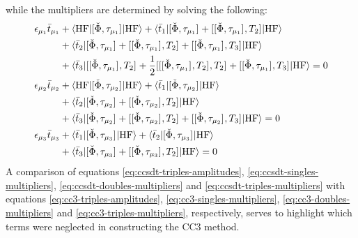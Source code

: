 while the multipliers are determined by solving the following:
\begin{subequations}\label{eq:ccsdt-multipliers}
  \begin{align}
    \epsilon_{\mu_1}\bar{t}_{\mu_1} &+
    \braket{\mathrm{HF} | [ \check{\Phi}, \tau_{\mu_1} ]^{} | \mathrm{HF}} +
    \braket{\bar{t}_{1} |
      [ \check{\Phi}, \tau_{\mu_1} ]^{}
    + [ [ \check{\Phi}, \tau_{\mu_1} ]^{}, T_2 ]^{}
    | \mathrm{HF}} \nonumber \\
   &+ \braket{\bar{t}_{2} |
      [ \check{\Phi}, \tau_{\mu_1} ]^{}
    + [ [ \check{\Phi}, \tau_{\mu_1} ]^{}, T_2 ]^{}
    + [ [ \check{\Phi}, \tau_{\mu_1} ]^{}, T_3 ]^{}
    | \mathrm{HF}} \nonumber \\
   &+ \braket{\bar{t}_{3} |
      [ [ \check{\Phi}, \tau_{\mu_1} ]^{}, T_2 ]^{}
    + \frac{1}{2}[ [ [ \check{\Phi}, \tau_{\mu_1} ]^{}, T_2 ]^{}, T_2 ]^{}
    + [ [ \check{\Phi}, \tau_{\mu_1} ]^{}, T_3 ]^{}
    | \mathrm{HF}}
             = 0 \label{eq:ccsdt-singles-multipliers} \\
    \epsilon_{\mu_2}\bar{t}_{\mu_2} &+
    \braket{\mathrm{HF} | [ \check{\Phi}, \tau_{\mu_2} ]^{} | \mathrm{HF}} +
    \braket{\bar{t}_{1} |
      [ \check{\Phi}, \tau_{\mu_2} ]^{}
    | \mathrm{HF}} \nonumber \\
   &+ \braket{\bar{t}_{2} |
      [ \check{\Phi}, \tau_{\mu_2} ]^{}
    + [ [ \check{\Phi}, \tau_{\mu_2} ]^{}, T_2 ]^{}
    | \mathrm{HF}} \nonumber \\
   &+ \braket{\bar{t}_{3} |
      [ \check{\Phi}, \tau_{\mu_2} ]^{}
    +  [ [ \check{\Phi}, \tau_{\mu_2} ]^{}, T_2 ]^{}
    +  [ [ \check{\Phi}, \tau_{\mu_2} ]^{}, T_3 ]^{}
    | \mathrm{HF}}
             = 0 \label{eq:ccsdt-doubles-multipliers} \\
    \epsilon_{\mu_3}\bar{t}_{\mu_3} &+
    \braket{\bar{t}_{1} |
      [ \check{\Phi}, \tau_{\mu_3} ]^{}
    | \mathrm{HF}}
    + \braket{\bar{t}_{2} |
      [ \check{\Phi}, \tau_{\mu_3} ]^{}
    | \mathrm{HF}} \nonumber \\
   &+ \braket{\bar{t}_{3} |
      [ \check{\Phi}, \tau_{\mu_3} ]^{}
    +  [ [ \check{\Phi}, \tau_{\mu_3} ]^{}, T_2 ]^{}
    | \mathrm{HF}}
             = 0 \label{eq:ccsdt-triples-multipliers}
  \end{align}
\end{subequations}
A comparison of equations \eqref{eq:ccsdt-triples-amplitudes},
\eqref{eq:ccsdt-singles-multipliers}, \eqref{eq:ccsdt-doubles-multipliers} and
\eqref{eq:ccsdt-triples-multipliers}
with equations \eqref{eq:cc3-triples-amplitudes},
\eqref{eq:cc3-singles-multipliers}, \eqref{eq:cc3-doubles-multipliers} and
\eqref{eq:cc3-triples-multipliers}, respectively, serves to highlight which terms were
neglected in constructing the \acrshort{CC3} method.

